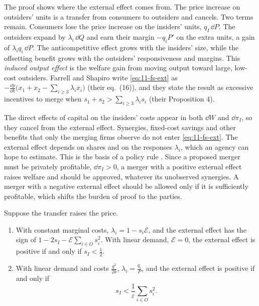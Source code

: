 The proof shows where the external effect comes from. The price increase on outsiders' units is a transfer from
consumers to outsiders and cancels. Two terms remain. Consumers lose the price increase on the insiders' units,
$q_I\,\dd P$. The outsiders expand by $\lambda_i\,\dd Q$ and earn their margin $-q_i P'$ on the extra units, a gain
of $\lambda_i q_i\,\dd P$. The anticompetitive effect grows with the insiders' size, while the offsetting benefit
grows with the outsiders' responsiveness and margins. This \emph{induced output effect} is the welfare gain from
moving output toward large, low-cost outsiders. Farrell and Shapiro write \eqref{eq:11-fs-ext} as
$-\frac{\dd p}{\dd k}\big(x_1 + x_2 - \sum_{i \ge 3}\lambda_i x_i\big)$ (their eq.~(16)), and
they state the result as excessive incentives to merge when $s_1 + s_2 > \sum_{i \ge 3}\lambda_i s_i$ (their
Proposition 4).

The direct effects of capital on the insiders' costs appear in both $\dd W$ and $\dd\pi_I$, so they cancel from
the external effect. Synergies, fixed-cost savings and other benefits that only the merging firms observe do not
enter \eqref{eq:11-fs-ext}. The external effect depends on shares and on the responses $\lambda_i$, which an agency
can hope to estimate. This is the basis of a policy rule \citep[p.~18]{FarrellShapiro1988}. Since a proposed merger
must be privately profitable, $\dd\pi_I > 0$, a merger with a positive external effect raises welfare and should be
approved, whatever its unobserved synergies. A merger with a negative external effect should be allowed only if
it is sufficiently profitable, which shifts the burden of proof to the parties.

\begin{corollary}\label{cor:11-ext-cases}
Suppose the transfer raises the price.
\begin{enumerate}[label=(\roman*)]
  \item With constant marginal costs, $\lambda_i = 1 - s_i\mathcal{E}$, and the external effect has the sign of
  $1 - 2s_I - \mathcal{E}\sum_{i \in O}s_i^2$. With linear demand, $\mathcal{E} = 0$, the external effect is
  positive if and only if $s_I < \frac{1}{2}$.
  \item With linear demand and costs $\frac{q^2}{2k}$, $\lambda_i = \frac{q_i}{P}$, and the external effect is
  positive if and only if
  \begin{equation}\label{eq:11-fs-prop7}
  s_I < \frac{1}{\varepsilon}\sum_{i \in O}s_i^2 .
  \end{equation}
\end{enumerate}
\end{corollary}

